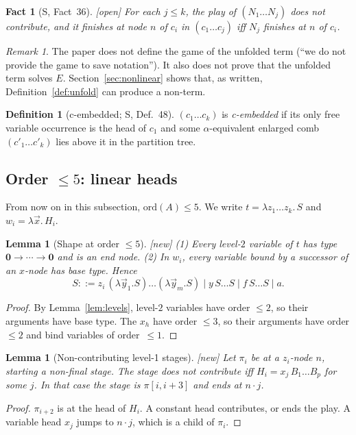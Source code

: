 \documentclass[11pt]{article}
\newcommand{\Ground}{\mathbf{0}}
\newcommand{\ord}{\mathrm{ord}}
\newcommand{\suc}[2]{#1{\cdot}#2}
\newcommand{\iv}[2]{\pi[#1,#2]}
\newcommand{\New}{\textsf{[new]}}
\newcommand{\Open}{\textsf{\color{red!60!black}[open]}}
\theoremstyle{plain}
\newtheorem{lemma}[theorem]{Lemma}
\newtheorem{fact}[theorem]{Fact}
\theoremstyle{definition}
\newtheorem{definition}[theorem]{Definition}
\theoremstyle{remark}
\newtheorem{remark}[theorem]{Remark}
\begin{document}
\begin{fact}[S, Fact~36]\label{fact:36}
\Open{} For each $j\le k$, the play of $(N_1\dots N_j)$ does not
contribute, and it finishes at node $n$ of $c_i$ in $(c_1\dots c_j)$ iff
$N_j$ finishes at $n$ of $c_i$.
\end{fact}

\begin{remark}
The paper does not define the game of the unfolded term (``we do not
provide the game to save notation'').  It also does not prove that the
unfolded term solves $E$.  Section~\ref{sec:nonlinear} shows that, as
written, Definition~\ref{def:unfold} can produce a non-term.
\end{remark}

\begin{definition}[c-embedded; S, Def.~48]
$(c_1\dots c_k)$ is \emph{c-embedded} if its only free variable
occurrence is the head of $c_1$ and some $\alpha$-equivalent enlarged
comb $(c'_1\dots c'_k)$ lies above it in the partition tree.
\end{definition}

\subsection{Order $\le5$: linear heads}

From now on in this subsection, $\ord(A)\le5$.  We write
$t=\lambda z_1\dots z_k.\,S$ and $w_i=\lambda\vec x.\,H_i$.

\begin{lemma}[Shape at order $\le5$]\label{lem:shape5}
\New{} (1) Every level-$2$ variable of $t$ has type $\Ground\to\cdots\to\Ground$
and is an end node.  (2) In $w_i$, every variable bound by a successor
of an $x$-node has base type.  Hence
\[
S::=z_i\,(\lambda\vec y_1.S)\dots(\lambda\vec y_m.S)\mid y\,S\dots S\mid
f\,S\dots S\mid a .
\]
\end{lemma}
\begin{proof}
By Lemma~\ref{lem:levels}, level-$2$ variables have order $\le2$, so
their arguments have base type.  The $x_h$ have order $\le3$, so their
arguments have order $\le2$ and bind variables of order~$\le1$.
\end{proof}

\begin{lemma}[Non-contributing level-1 stages]\label{lem:lvl1stage}
\New{} Let $\pi_i$ be at a $z_i$-node $n$, starting a non-final stage.
The stage does not contribute iff $H_i=x_j\,B_1\dots B_p$ for some $j$.
In that case the stage is $\iv i{i+3}$ and ends at $\suc nj$.
\end{lemma}
\begin{proof}
$\pi_{i+2}$ is at the head of $H_i$.  A constant head contributes, or
ends the play.  A variable head $x_j$ jumps to $\suc nj$, which is a
child of $\pi_i$.
\end{proof}
\end{document}
